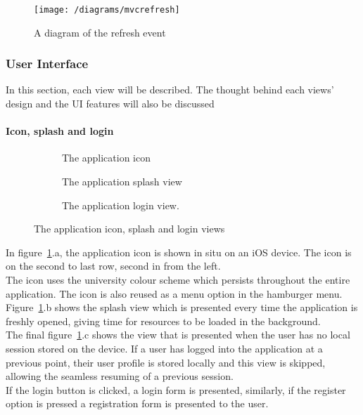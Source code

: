 \documentclass[draft,preprint,12pt,3p]{elsarticle}
\begin{document}
\begin{figure}[H]
    \centering
    \texttt{[image: /diagrams/mvcrefresh]}
    \caption {A diagram of the refresh event}
\end{figure}

\subsubsection{User Interface}
In this section, each view will be described. The thought behind each views' design and the UI features will also be discussed
\paragraph{Icon, splash and login}
\begin{figure}[H]
    \centering
    \begin{subfigure}[t]{0.32\columnwidth}
        \centering
        \caption{The application icon}
    \end{subfigure}
    \begin{subfigure}[t]{0.32\columnwidth}
        \centering
        \caption{The application splash view}
    \end{subfigure}
    \begin{subfigure}[t]{0.32\columnwidth}
        \centering
        \caption{The application login view.}
    \end{subfigure}
    \caption{The application icon, splash and login views}
    \label{fig:iconsplashlogin}
\end{figure}
In figure~\ref{fig:iconsplashlogin}.a, the application icon is shown in situ on an iOS device. The icon is on the second to last row, second in from the left.\\
The icon uses the university colour scheme which persists throughout the entire application. The icon is also reused as a menu option in the hamburger menu.\\
Figure~\ref{fig:iconsplashlogin}.b shows the splash view which is presented every time the application is freshly opened, giving time for resources to be loaded in the background.\\
The final figure~\ref{fig:iconsplashlogin}.c shows the view that is presented when the user has no local session stored on the device. If a user has logged into the application at a previous point, their user profile is stored locally and this view is skipped, allowing the seamless resuming of a previous session.\\
If the login button is clicked, a login form is presented, similarly, if the register option is pressed a registration form is presented to the user.
\end{document}
